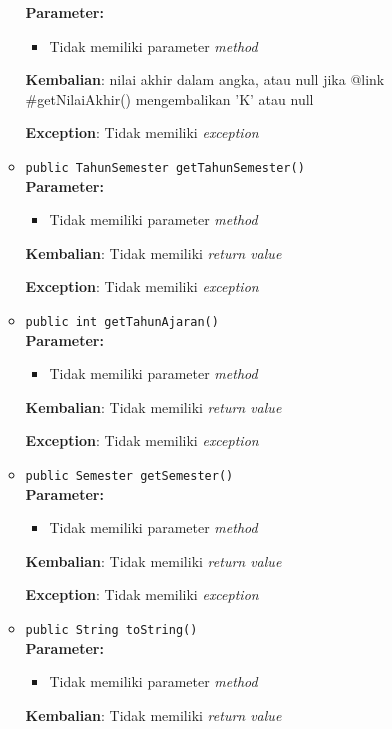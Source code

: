 \documentclass{article}
\begin{document}
\begin{enumerate}
\begin{itemize}
\textbf{Parameter:}\begin{itemize}
\item Tidak memiliki parameter \textit{method}
\end{itemize}
\textbf{Kembalian}: nilai akhir dalam angka, atau null jika {@link #getNilaiAkhir() mengembalikan 'K' atau null}

\textbf{Exception}: Tidak memiliki \textit{exception}

\item \texttt{public TahunSemester getTahunSemester()}\\ 


\textbf{Parameter:}\begin{itemize}
\item Tidak memiliki parameter \textit{method}
\end{itemize}
\textbf{Kembalian}: Tidak memiliki \textit{return value}

\textbf{Exception}: Tidak memiliki \textit{exception}

\item \texttt{public int getTahunAjaran()}\\ 


\textbf{Parameter:}\begin{itemize}
\item Tidak memiliki parameter \textit{method}
\end{itemize}
\textbf{Kembalian}: Tidak memiliki \textit{return value}

\textbf{Exception}: Tidak memiliki \textit{exception}

\item \texttt{public Semester getSemester()}\\ 


\textbf{Parameter:}\begin{itemize}
\item Tidak memiliki parameter \textit{method}
\end{itemize}
\textbf{Kembalian}: Tidak memiliki \textit{return value}

\textbf{Exception}: Tidak memiliki \textit{exception}

\item \texttt{public String toString()}\\ 


\textbf{Parameter:}\begin{itemize}
\item Tidak memiliki parameter \textit{method}
\end{itemize}
\textbf{Kembalian}: Tidak memiliki \textit{return value}


\end{itemize}
\end{enumerate}
\end{document}
